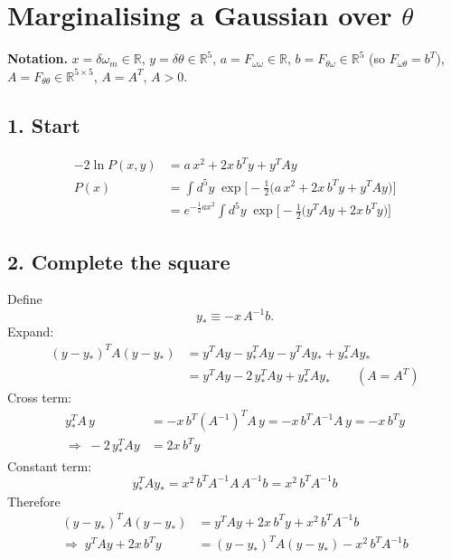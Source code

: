 \documentclass[11pt]{article}
\begin{document}
\section*{Marginalising a Gaussian over $\theta$}

\textbf{Notation.} $x=\delta\omega_m\in\mathbb{R}$, \quad $y=\delta\theta\in\mathbb{R}^5$, \quad
$a=F_{\omega\omega}\in\mathbb{R}$, \quad $b=F_{\theta\omega}\in\mathbb{R}^5$ (so $F_{\omega\theta}=b^{T}$), \quad
$A=F_{\theta\theta}\in\mathbb{R}^{5\times5}$, $A=A^{T}$, $A>0$.

\subsection*{1. Start}
\begin{align}
-2\ln P(x,y) &= a\,x^2 + 2x\,b^{T}y + y^{T}Ay \\[4pt]
P(x) &= \int d^5y\; \exp\!\Big[-\tfrac12\big(a\,x^2 + 2x\,b^{T}y + y^{T}Ay\big)\Big] \\
&= e^{-\frac12 a x^2}\int d^5y\; \exp\!\Big[-\tfrac12\big(y^{T}Ay + 2x\,b^{T}y\big)\Big]
\end{align}

\subsection*{2. Complete the square}
Define
\begin{equation}
y_* \equiv -x\,A^{-1}b .
\end{equation}
Expand:
\begin{align}
(y-y_*)^{T}A(y-y_*) &= y^{T}Ay - y_*^{T}Ay - y^{T}Ay_* + y_*^{T}Ay_* \\
&= y^{T}Ay - 2\,y_*^{T}Ay + y_*^{T}Ay_* \qquad (A=A^{T})
\end{align}
Cross term:
\begin{align}
y_*^{T}A\,y &= -x\,b^{T}(A^{-1})^{T}A\,y = -x\,b^{T}A^{-1}A\,y = -x\,b^{T}y \\
\Rightarrow\; -2\,y_*^{T}Ay &= 2x\,b^{T}y
\end{align}
Constant term:
\begin{equation}
y_*^{T}Ay_* = x^2\,b^{T}A^{-1}A\,A^{-1}b = x^2\,b^{T}A^{-1}b
\end{equation}
Therefore
\begin{align}
(y-y_*)^{T}A(y-y_*) &= y^{T}Ay + 2x\,b^{T}y + x^2\,b^{T}A^{-1}b \\
\Rightarrow\; y^{T}Ay + 2x\,b^{T}y &= (y-y_*)^{T}A(y-y_*) - x^2\,b^{T}A^{-1}b
\end{align}
\end{document}
